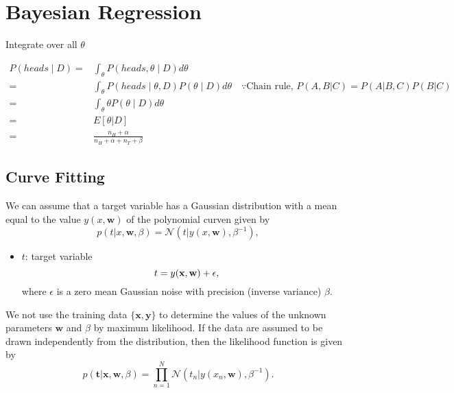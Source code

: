 \chapter{Bayesian Regression}

Integrate over all $\theta$

\begin{align}
P(heads \mid D) =& \int_{\theta} P(heads, \theta \mid D) d\theta\\
 =& \int_{\theta} P(heads \mid \theta, D) P(\theta \mid D) d\theta \quad \because  \textrm{Chain rule, } P(A,B|C)=P(A|B,C)P(B|C)\\ 
  =& \int_{\theta} \theta P(\theta \mid D) d\theta\\ 
  =&E\left[\theta|D\right]\\
 =&\frac{n_H + \alpha}{n_H + \alpha + n_T + \beta}
\end{align}


\section{Curve Fitting}
We can assume that a target variable has a Gaussian distribution with a mean equal to the value $y(x,\mathbf{w})$ of the polynomial curven given by
\begin{equation}
	p(t|x, \mathbf{w}, \beta) = \mathcal{N}(t|y(x,\mathbf{w}), \beta^{-1}),
	\label{eq:curve}
\end{equation}
\begin{itemize}
	\item $t$: target variable
		$$t = y({\mathbf{x}}, {\mathbf{w}}) +\epsilon,$$
	where $\epsilon$ is a zero mean Gaussian noise with precision (inverse variance) $\beta$. 
\end{itemize}

We not use the training data $\{\mathbf{x,y}\}$ to determine the values of the unknown parameters $\mathbf{w}$ and $\beta$ by maximum likelihood. If the data are assumed to be drawn independently from the distribution, then the likelihood function is given by 
\begin{equation}
	p(\mathbf{t}|\mathbf{x,w},\beta) = \prod_{n=1}^{N}\mathcal{N}(t_n|y(x_n,\mathbf{w}), \beta^{-1}).
	\label{eq:curve_ml}
\end{equation}

